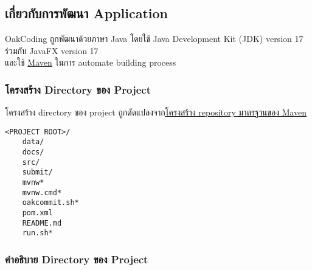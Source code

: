 \noindent{}


\pagebreak
\subsection*{เกี่ยวกับการพัฒนา Application}

OakCoding ถูกพัฒนาด้วยภาษา Java โดยใช้ Java Development Kit (JDK) version 17 ร่วมกับ JavaFX version 17\\
และใช้ \href{https://maven.apache.org/}{Maven} ในการ automate building process

\subsubsection*{โครงสร้าง Directory ของ Project}

โครงสร้าง directory ของ project ถูกดัดแปลงจาก\href{https://maven.apache.org/guides/introduction/introduction-to-the-standard-directory-layout.html}{โครงสร้าง repository มาตรฐานของ Maven}

\setlength{\parindent}{0em}
\setlength{\columnsep}{2pt}
\begin{lstlisting}[name={Project Directory Layout},numbers=none]
<PROJECT ROOT>/
    data/
    docs/
    src/
    submit/
    mvnw*
    mvnw.cmd*
    oakcommit.sh*
    pom.xml
    README.md
    run.sh*
\end{lstlisting}

\subsubsection*{คำอธิบาย Directory ของ Project}

